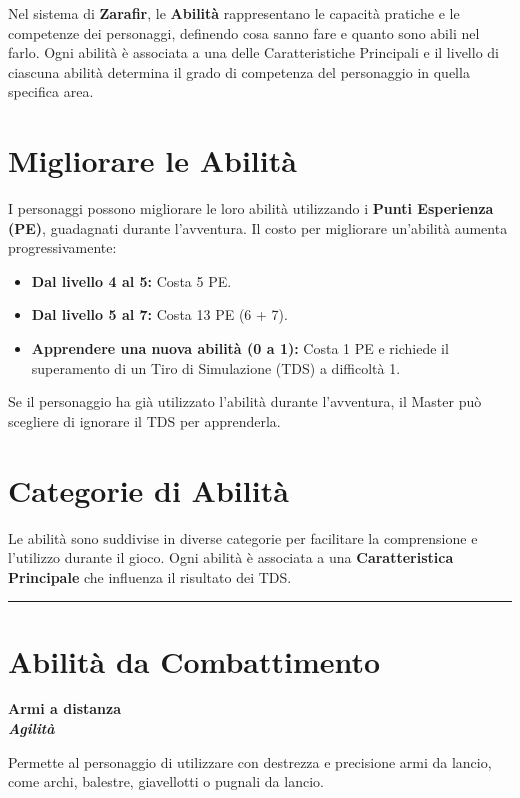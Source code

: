 \documentclass[../manuale_main.tex]{subfiles}
\begin{document}
Nel sistema di \textbf{Zarafir}, le \textbf{Abilità} rappresentano le capacità pratiche e le competenze dei personaggi, definendo cosa sanno fare e quanto sono abili nel farlo. Ogni abilità è associata a una delle Caratteristiche Principali e il livello di ciascuna abilità determina il grado di competenza del personaggio in quella specifica area.

\vspace{0.3cm}

\section*{Migliorare le Abilità}
I personaggi possono migliorare le loro abilità utilizzando i \textbf{Punti Esperienza (PE)}, guadagnati durante l’avventura. Il costo per migliorare un’abilità aumenta progressivamente:

\begin{itemize}
    \item \textbf{Dal livello 4 al 5:} Costa 5 PE.
    \item \textbf{Dal livello 5 al 7:} Costa 13 PE (6 + 7).
    \item \textbf{Apprendere una nuova abilità (0 a 1):} Costa 1 PE e richiede il superamento di un Tiro di Simulazione (TDS) a difficoltà 1.
\end{itemize}

Se il personaggio ha già utilizzato l’abilità durante l’avventura, il Master può scegliere di ignorare il TDS per apprenderla.

\vspace{0.3cm}

\section*{Categorie di Abilità}
Le abilità sono suddivise in diverse categorie per facilitare la comprensione e l’utilizzo durante il gioco. Ogni abilità è associata a una \textbf{Caratteristica Principale} che influenza il risultato dei TDS.

\vspace{0.5cm}
\rule{\textwidth}{0.4pt}
\vspace{0.5cm}

\section{Abilità da Combattimento}

\begin{center}
\textbf{\large{Armi a distanza}}\\ \textit{\textbf{Agilità}}\\
\end{center}
Permette al personaggio di utilizzare con destrezza e precisione armi da lancio, come archi, balestre, giavellotti o pugnali da lancio.
\end{document}
